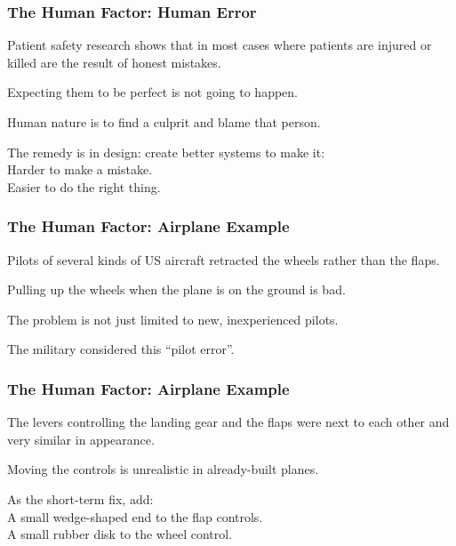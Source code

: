 \begin{frame}
\frametitle{The Human Factor: Human Error}
\begin{changemargin}{1cm}

Patient safety research shows that in most cases where patients are injured or killed are the result of honest mistakes.

Expecting them to be perfect is not going to happen.

Human nature is to find a culprit and blame that person.

The remedy is in design: create better systems to make it: \\
\quad Harder to make a mistake.\\
\quad Easier to do the right thing.

\end{changemargin}
\end{frame}

\begin{frame}
\frametitle{The Human Factor: Airplane Example}
\begin{changemargin}{1cm}

Pilots of several kinds of US aircraft retracted the wheels rather than the flaps.

Pulling up the wheels when the plane is on the ground is bad.

The problem is not just limited to new, inexperienced pilots.

The military considered this ``pilot error''.

\end{changemargin}
\end{frame}

\begin{frame}
\frametitle{The Human Factor: Airplane Example}
\begin{changemargin}{1cm}

The levers controlling the landing gear and the flaps were next to each other and very similar in appearance.

Moving the controls is unrealistic in already-built planes.

As the short-term fix, add:\\
\quad A small wedge-shaped end to the flap controls.\\
\quad A small rubber disk to the wheel control.

\end{changemargin}
\end{frame}


